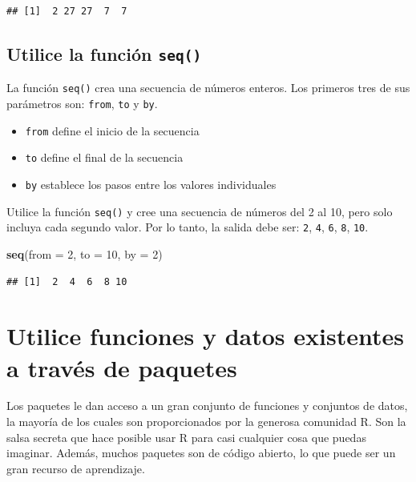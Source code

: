 \documentclass[
]{book}
\newenvironment{Shaded}{\begin{snugshade}}{\end{snugshade}}
\newcommand{\DataTypeTok}[1]{\textcolor[rgb]{0.13,0.29,0.53}{#1}}
\newcommand{\DecValTok}[1]{\textcolor[rgb]{0.00,0.00,0.81}{#1}}
\newcommand{\KeywordTok}[1]{\textcolor[rgb]{0.13,0.29,0.53}{\textbf{#1}}}
\newcommand{\NormalTok}[1]{#1}
\providecommand{\tightlist}{%
  \setlength{\itemsep}{0pt}\setlength{\parskip}{0pt}}
\begin{document}
\begin{verbatim}
## [1]  2 27 27  7  7
\end{verbatim}

\hypertarget{utilice-la-funciuxf3n-seq}{%
\subsection{\texorpdfstring{Utilice la función \texttt{seq()}}{Utilice la función seq()}}\label{utilice-la-funciuxf3n-seq}}

La función \texttt{seq()} crea una secuencia de números enteros. Los primeros tres de sus parámetros son: \texttt{from}, \texttt{to} y \texttt{by}.

\begin{itemize}
\tightlist
\item
  \texttt{from} define el inicio de la secuencia
\item
  \texttt{to} define el final de la secuencia
\item
  \texttt{by} establece los pasos entre los valores individuales
\end{itemize}

Utilice la función \texttt{seq()} y cree una secuencia de números del 2 al 10, pero solo incluya cada segundo valor. Por lo tanto, la salida debe ser: \texttt{2}, \texttt{4}, \texttt{6}, \texttt{8}, \texttt{10}.

\begin{Shaded}
\begin{Highlighting}[]
\KeywordTok{seq}\NormalTok{(}\DataTypeTok{from =} \DecValTok{2}\NormalTok{, }\DataTypeTok{to =} \DecValTok{10}\NormalTok{, }\DataTypeTok{by =} \DecValTok{2}\NormalTok{)}
\end{Highlighting}
\end{Shaded}

\begin{verbatim}
## [1]  2  4  6  8 10
\end{verbatim}

\hypertarget{utilice-funciones-y-datos-existentes-a-travuxe9s-de-paquetes}{%
\section{Utilice funciones y datos existentes a través de paquetes}\label{utilice-funciones-y-datos-existentes-a-travuxe9s-de-paquetes}}

Los paquetes le dan acceso a un gran conjunto de funciones y conjuntos de datos, la mayoría de los cuales son proporcionados por la generosa comunidad R. Son la salsa secreta que hace posible usar R para casi cualquier cosa que puedas imaginar. Además, muchos paquetes son de código abierto, lo que puede ser un gran recurso de aprendizaje.
\end{document}
